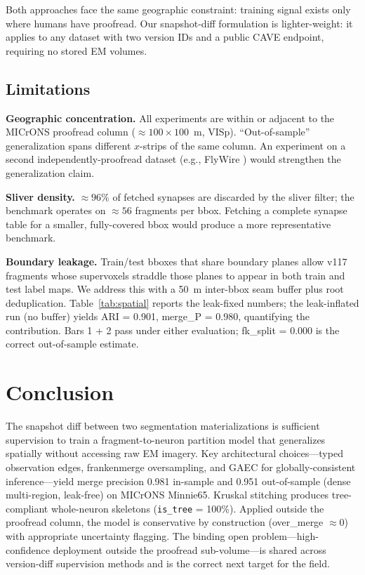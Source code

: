 \documentclass[10pt,letterpaper]{article}
\begin{document}
Both approaches face the same geographic constraint: training signal exists only where
humans have proofread. Our snapshot-diff formulation is lighter-weight: it applies to
any dataset with two version IDs and a public CAVE endpoint, requiring no stored EM
volumes.

\subsection{Limitations}

\textbf{Geographic concentration.} All experiments are within or adjacent to the MICrONS
proofread column (${\approx}100 \times 100$~\textmu{}m, VISp). ``Out-of-sample''
generalization spans different $x$-strips of the same column. An experiment on a second
independently-proofread dataset (e.g., FlyWire \cite{flywire2023}) would strengthen the
generalization claim.

\textbf{Sliver density.} ${\approx}96\%$ of fetched synapses are discarded by the sliver
filter; the benchmark operates on ${\approx}56$ fragments per bbox. Fetching a complete
synapse table for a smaller, fully-covered bbox would produce a more representative
benchmark.

\textbf{Boundary leakage.} Train/test bboxes that share boundary planes allow v117
fragments whose supervoxels straddle those planes to appear in both train and test label
maps. We address this with a 50~\textmu{}m inter-bbox seam buffer plus root
deduplication. Table~\ref{tab:spatial} reports the leak-fixed numbers; the leak-inflated
run ($\text{no buffer}$) yields ARI = 0.901, merge\_P = 0.980, quantifying the
contribution. Bars 1 + 2 pass under either evaluation; fk\_split = 0.000 is the correct
out-of-sample estimate.

\section{Conclusion}

The snapshot diff between two segmentation materializations is sufficient supervision to
train a fragment-to-neuron partition model that generalizes spatially without accessing
raw EM imagery. Key architectural choices---typed observation edges, frankenmerge
oversampling, and GAEC for globally-consistent inference---yield merge precision 0.981
in-sample and 0.951 out-of-sample (dense multi-region, leak-free) on MICrONS Minnie65.
Kruskal stitching produces tree-compliant whole-neuron skeletons (\texttt{is\_tree} = 100\%).
Applied outside the proofread column, the model is conservative by construction
(over\_merge $\approx 0$) with appropriate uncertainty flagging. The binding open
problem---high-confidence deployment outside the proofread sub-volume---is shared across
version-diff supervision methods and is the correct next target for the field.



\end{document}
